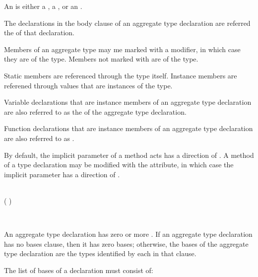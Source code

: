 An  is either a , a , or an .

The declarations in the body clause of an aggregate type declaration are referred the  of that declaration.


Members of an aggregate type may me marked with a  modifier, in which case they are  of the type.
Members not marked with  are  of the type.

Static members are referenced through the type itself.
Instance members are referened through values that are instances of the type.


Variable declarations that are instance members of an aggregate type declaration are also referred to as the  of the aggregate type declaration.


Function declarations that are instance members of an aggregate type declaration are also referred to as .

By default, the implicit  parameter of a method acts has a direction of .
A method of a  type declaration may be modified with the \code{[mutating]} attribute, in which case the implicit  parameter has a direction of .


\begin{Syntax}
     \\
        \code{:}  (\code{,} )\SynStar

     \\
\end{Syntax}

An aggregate type declaration has zero or more .
If an aggregate type declaration has no bases clause, then it has zero bases;
otherwise, the bases of the aggregate type declaration are the types identified by each  in that clause.

The list of bases of a  declaration must consist of:

